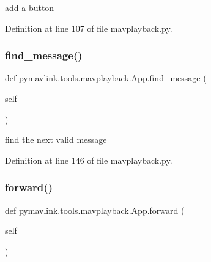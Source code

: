 \begin{DoxyVerb}add a button\end{DoxyVerb}
 

Definition at line 107 of file mavplayback.\+py.

\mbox{\label{classpymavlink_1_1tools_1_1mavplayback_1_1App_a51fb5db450ed3c0988122799a5cf2727}} 
\subsubsection{\texorpdfstring{find\_message()}{find\_message()}}
{\footnotesize\ttfamily def pymavlink.\+tools.\+mavplayback.\+App.\+find\+\_\+message (\begin{DoxyParamCaption}\item[{}]{self }\end{DoxyParamCaption})}

\begin{DoxyVerb}find the next valid message\end{DoxyVerb}
 

Definition at line 146 of file mavplayback.\+py.

\mbox{\label{classpymavlink_1_1tools_1_1mavplayback_1_1App_a09ac8360859a9b2e685612b6504fb951}} 
\subsubsection{\texorpdfstring{forward()}{forward()}}
{\footnotesize\ttfamily def pymavlink.\+tools.\+mavplayback.\+App.\+forward (\begin{DoxyParamCaption}\item[{}]{self }\end{DoxyParamCaption})}


